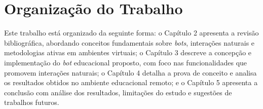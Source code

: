\section{Organização do Trabalho}
\label{sec:organizacao}

Este trabalho está organizado da seguinte forma: o Capítulo 2 apresenta a
revisão bibliográfica, abordando conceitos fundamentais sobre \textit{bots},
interações naturais e metodologias ativas em ambientes virtuais; o Capítulo 3
descreve a concepção e implementação do \textit{bot} educacional proposto, com
foco nas funcionalidades que promovem interações naturais; o Capítulo 4 detalha
a prova de conceito e analisa os resultados obtidos no ambiente educacional
remoto; e o Capítulo 5 apresenta a conclusão com análise dos resultados,
limitações do estudo e sugestões de trabalhos futuros.
